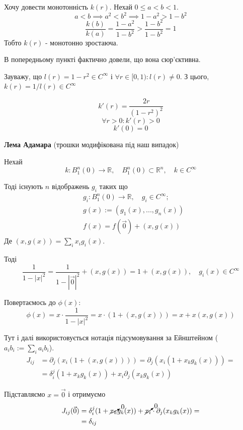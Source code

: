 \documentclass[10pt, a4paper]{article} %
\newcommand{\R}{\mathbb{R}}
\begin{document}


Хочу довести монотонність $k(r)$. Нехай $0\le a<b < 1$.
\[a<b \implies a^2 < b^2 \implies 1-a^2 > 1-b^2\]
\[\frac{k(b)}{k(a)} = \frac{1-a^2}{1-b^2} > \frac{1-b^2}{1-b^2} = 1 \]
Тобто $k(r)$ - монотонно зростаюча.

В попередньому пункті фактично довели, що вона сюр'єктивна.

Зауважу, що $l(r)=1-r^2 \in C^\infty$ і $\forall r \in [0,1): l(r) \ne 0$.
З цього, $k(r) = 1/l(r) \in C^\infty$

\[k'(r) = \frac{2r}{(1-r^2)^2}\]
\[\forall r>0: k'(r) > 0\]
\[k'(0) = 0\]

\begin{mdframed}[backgroundcolor=purple!20]
    \textbf{Лема Адамара} (трошки модифікована під наш випадок)

    Нехай 
    \[k : B^n_1(0) \to \R, \quad B^n_1(0) \subset \R^n, \quad k \in C^\infty\]
    
    Тоді існують $n$ відображень $g_i$ таких що 
    \begin{align*}
        & g_i : B^n_1(0) \to \R, \quad g_i \in C^\infty;\\
        & g(x) := (g_1(x), ..., g_n(x))\\
        & f(x) = f(\vec 0) + (x, g(x)) 
    \end{align*}
    Де $(x,g(x)) = \sum_i x_ig_i(x)$.
\end{mdframed}

Тоді 
\[\frac{1}{1-|x|^2} = \frac{1}{1-|\vec 0|^2} + (x, g(x)) = 1 + (x, g(x)), \quad g_i(x)\in C^\infty\]

Повертаємось до $\phi(x)$:
\[\phi(x) = x \cdot \frac{1}{1-|x|^2} = x \cdot (1 + (x, g(x))) = x + x(x,g(x))\]

Тут і далі використовується нотація підсумовування за Ейнштейном ($a_ib_i := \sum_i a_ib_i$).
\begin{align*}
    J_{ij} &= \partial_j (x_i(1+(x,g(x)))) = \partial_j (x_i(1+x_kg_k(x))) = \\
    & = \delta^j_i (1+x_kg_k(x)) + x_i \partial_j (x_kg_k(x))
\end{align*}

Підставляємо $x=\vec 0$ і отримуємо
\begin{align*}
    J_{ij}(\vec 0) &= \delta^j_i (1+\cancelto{0}{x_k}g_k(x)) + \cancelto{0}{x_i} \cdot \partial_j (x_kg_k(x)) = \\
    & = \delta_{ij}
\end{align*}
\end{document}
